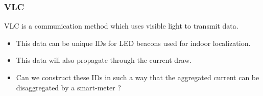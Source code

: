 \documentclass{beamer}
\begin{document}
	\begin{frame}\frametitle{VLC}

		VLC is a communication method which uses visible light to transmit data.

		\begin{itemize}

			\item This data can be unique IDs for LED beacons used for indoor localization.

			\item This data will also propagate through the current draw.

			\item Can we construct these IDs in such a way that the aggregated current can be disaggregated by a smart-meter ?

		\end{itemize}

	\end{frame}
\end{document}
